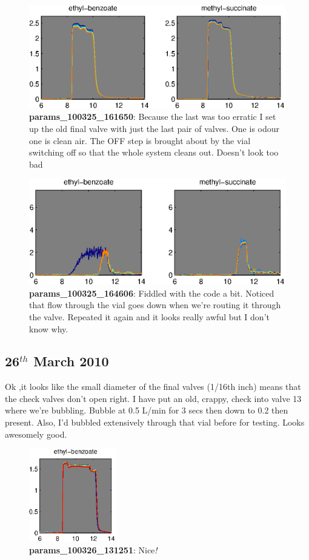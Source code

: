 \documentclass[a4paper]{report}
\begin{document}
\begin{figure}
\centering
\includegraphics[width=5in]{params_100325_161650.eps}
\caption{\textbf{params\_100325\_161650}: Because the last was too
  erratic I set up the old final valve with just the last pair of
  valves. One is odour one is clean air. The OFF step is brought about
  by the vial switching off so that the whole system cleans out.
  Doesn't look too bad }
\end{figure}


\begin{figure}
\centering
\includegraphics[width=5in]{params_100325_164606.eps}
\caption{\textbf{params\_100325\_164606}: Fiddled with the code a
  bit. Noticed that flow through the vial goes down when we're routing
  it through the valve. Repeated it again and it looks really awful
  but I don't know why.  }
\end{figure}

\clearpage
\subsection{26$^{th}$ March 2010}
Ok ,it looks like the small diameter of the final valves (1/16th inch)
means that the check valves don't open right. 
I have put an old, crappy, check into valve 13 where we're bubbling. 
Bubble at 0.5 L/min for 3 secs then down to 0.2 then present. Also,
I'd bubbled extensively through that vial before for testing. Looks
awesomely good.
\begin{figure}[h]
\centering
\includegraphics[width=1.5in]{params_100326_131251.eps}
\caption{\textbf{params\_100326\_131251}: Nice\textit{!}}
\label{fig:equilibrated}
\end{figure}
\end{document}
